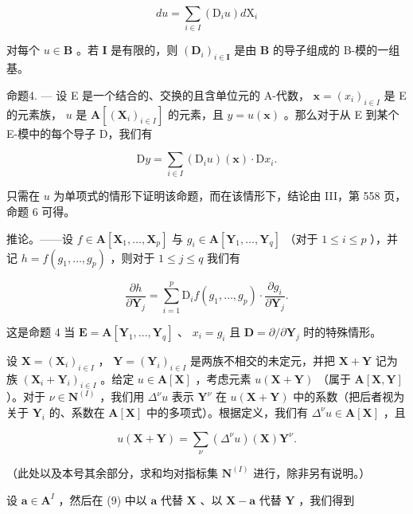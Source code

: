 \[
d u = \sum_ {i \in I} \left(\mathrm{D} _ {i} u\right) d \mathrm{X} _ {i}\tag{7}
\]

对每个 \(u \in \mathbf{B}\) 。若 \(\mathbf{I}\) 是有限的，则 \((\mathbf{D}_i)_{i \in \mathbf{I}}\) 是由 \(\mathbf{B}\) 的导子组成的 B-模的一组基。

命题4. --- 设 E 是一个结合的、交换的且含单位元的 A-代数， \(\mathbf{x} = (x_i)_{i\in I}\) 是 E 的元素族， \(u\) 是 \(\mathbf{A}[(\mathbf{X}_i)_{i\in I}]\) 的元素，且 \(y = u(\mathbf{x})\) 。那么对于从 E 到某个 E-模中的每个导子 D，我们有

\[
\mathrm{D} y = \sum_ {i \in I} \left(\mathrm{D} _ {i} u\right) (\mathbf {x}) \cdot \mathrm{D} x _ {i}.
\]

只需在 \(u\) 为单项式的情形下证明该命题，而在该情形下，结论由 III，第 558 页，命题 6 可得。

推论。——设 \(f \in \mathbf{A}[\mathbf{X}_1, \ldots, \mathbf{X}_p]\) 与 \(g_i \in \mathbf{A}[\mathbf{Y}_1, \ldots, \mathbf{Y}_q]\) （对于 \(1 \leqslant i \leqslant p\) ），并记 \(h = f(g_1, \ldots, g_p)\) ，则对于 \(1 \leqslant j \leqslant q\) 我们有

\[
\frac {\partial h}{\partial \mathbf {Y} _ {j}} = \sum_ {i = 1} ^ {p} \mathrm{D} _ {i} f (g _ {1}, \dots , g _ {p}) \cdot \frac {\partial g _ {i}}{\partial \mathbf {Y} _ {j}}.\tag{8}
\]

这是命题 4 当 \(\mathbf{E} = \mathbf{A}[\mathbf{Y}_1,\dots ,\mathbf{Y}_q]\) 、 \(x_{i} = g_{i}\) 且 \(\mathbf{D} = \partial /\partial \mathbf{Y}_j\) 时的特殊情形。

设 \(\mathbf{X} = (\mathbf{X}_i)_{i\in I}\) ， \(\mathbf{Y} = (\mathbf{Y}_i)_{i\in I}\) 是两族不相交的未定元，并把 \(\mathbf{X} + \mathbf{Y}\) 记为族 \((\mathbf{X}_i + \mathbf{Y}_i)_{i\in I}\) 。给定 \(u\in \mathbf{A}[\mathbf{X}]\) ，考虑元素 \(u(\mathbf{X} + \mathbf{Y})\) （属于 \(\mathbf{A}[\mathbf{X},\mathbf{Y}]\) ）。对于 \(\nu \in \mathbf{N}^{(I)}\) ，我们用 \(\Delta^{\nu}u\) 表示 \(\mathbf{Y}^{\nu}\) 在 \(u(\mathbf{X} + \mathbf{Y})\) 中的系数（把后者视为关于 \(\mathbf{Y}_i\) 的、系数在 \(\mathbf{A}[\mathbf{X}]\) 中的多项式）。根据定义，我们有 \(\Delta^{\nu}u\in \mathbf{A}[\mathbf{X}]\) ，且

\[
u (\mathbf {X} + \mathbf {Y}) = \sum_ {\nu} \left(\Delta^ {\nu} u\right) (\mathbf {X}) \mathbf {Y} ^ {\nu}.\tag{9}
\]

（此处以及本号其余部分，求和均对指标集 \(\mathbf{N}^{(I)}\) 进行，除非另有说明。）

设 \(\mathbf{a} \in \mathbf{A}^{I}\) ，然后在 (9) 中以 \(\mathbf{a}\) 代替 \(\mathbf{X}\) 、以 \(\mathbf{X} - \mathbf{a}\) 代替 \(\mathbf{Y}\) ，我们得到


